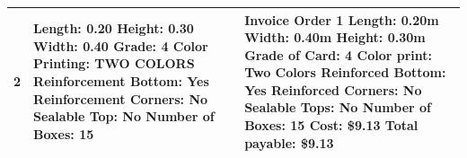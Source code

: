 \documentclass[12pt]{article}
\begin{document}
\begin{tabular}{| p{1cm} | p{6cm} | p{6cm} |}
	2 & Length: 0.20\newline
	Height: 0.30\newline
	Width: 0.40\newline
	Grade: 4\newline
	Color Printing: TWO COLORS\newline
	Reinforcement Bottom: Yes\newline
	Reinforcement Corners: No\newline
	Sealable Top: No\newline
	Number of Boxes: 15 & Invoice\newline
	\newline
	Order 1\newline
	Length: 0.20m\newline
	Width: 0.40m\newline
	Height: 0.30m\newline
	Grade of Card: 4\newline
	Color print: Two Colors\newline
	Reinforced Bottom: Yes\newline
	Reinforced Corners: No\newline
	Sealable Tops: No\newline
	Number of Boxes: 15\newline
	Cost: \$9.13\newline
	\newline
	Total payable: \$9.13 \\ \hline
\end{tabular}
\newpage
\end{document}
